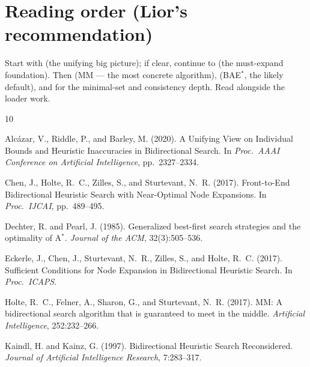 \documentclass[11pt]{article}
\begin{document}
\section*{Reading order (Lior's recommendation)}
Start with \citet{siag2025bridging} (the unifying big picture); if clear, continue to
\citet{eckerle2017sufficient} (the must-expand foundation). Then
\citet{holte2017mm} (MM --- the most concrete algorithm), \citet{alcazar2020unifying}
(BAE$^{*}$, the likely default), and \citet{shaham2017minimal,shaham2018consistent} for the
minimal-set and consistency depth. Read \citet{nobes2023voxel} alongside the loader work.

\begin{thebibliography}{10}

Alc\'azar, V., Riddle, P., and Barley, M. (2020).
\newblock A Unifying View on Individual Bounds and Heuristic Inaccuracies in
  Bidirectional Search.
\newblock In \emph{Proc.\ AAAI Conference on Artificial Intelligence}, pp.\ 2327--2334.

Chen, J., Holte, R.~C., Zilles, S., and Sturtevant, N.~R. (2017).
\newblock Front-to-End Bidirectional Heuristic Search with Near-Optimal Node
  Expansions.
\newblock In \emph{Proc.\ IJCAI}, pp.\ 489--495.

Dechter, R. and Pearl, J. (1985).
\newblock Generalized best-first search strategies and the optimality of A$^{*}$.
\newblock \emph{Journal of the ACM}, 32(3):505--536.

Eckerle, J., Chen, J., Sturtevant, N.~R., Zilles, S., and Holte, R.~C. (2017).
\newblock Sufficient Conditions for Node Expansion in Bidirectional Heuristic
  Search.
\newblock In \emph{Proc.\ ICAPS}.

Holte, R.~C., Felner, A., Sharon, G., and Sturtevant, N.~R. (2017).
\newblock MM: A bidirectional search algorithm that is guaranteed to meet in
  the middle.
\newblock \emph{Artificial Intelligence}, 252:232--266.

Kaindl, H. and Kainz, G. (1997).
\newblock Bidirectional Heuristic Search Reconsidered.
\newblock \emph{Journal of Artificial Intelligence Research}, 7:283--317.


\end{thebibliography}
\end{document}
